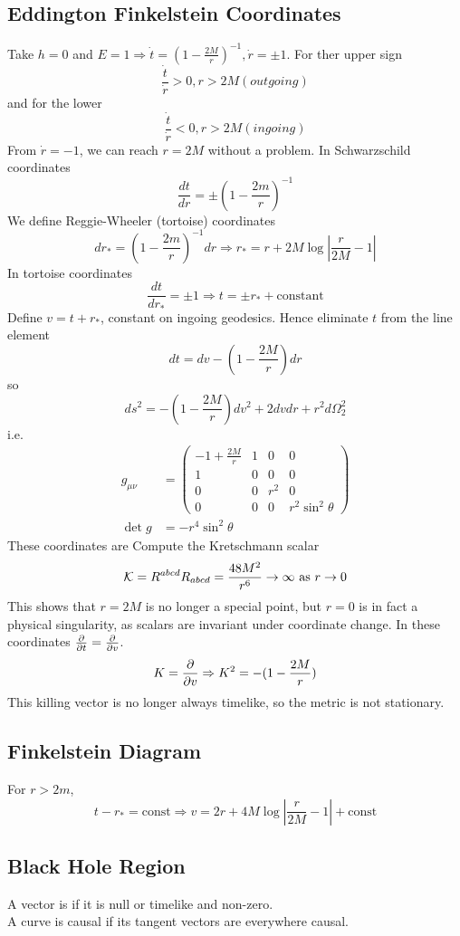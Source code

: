 \documentclass{article}
\begin{document}
\subsection{Eddington Finkelstein Coordinates}
Take $h=0$ and $E=1 \Rightarrow \dot{t} = (1-\frac{2M}{r})^{-1}, \dot{r} = \pm1$. For ther upper sign 
\[
\frac{\dot{t}}{\dot{r}} > 0, r>2M (outgoing)
\]
and for the lower 
\[
\frac{\dot{t}}{\dot{r}} < 0, r>2M (ingoing)
\]
From $\dot{r}=-1$, we can reach $r=2M$ without a problem. In Schwarzschild coordinates 
\[
\frac{dt}{dr} = \pm (1-\frac{2m}{r} )^{-1}
\]
We define Reggie-Wheeler (tortoise) coordinates
\[
dr_\ast = (1-\frac{2m}{r} )^{-1} dr \Rightarrow r_\ast = r+2M\log \left\lvert \frac{r}{2M} -1 \right\rvert
\]
In tortoise coordinates 
\[
\frac{dt}{dr_\ast} = \pm 1 \Rightarrow t = \pm r_\ast + \text{constant}
\]
Define $v=t+r_\ast$, constant on ingoing geodesics. Hence eliminate $t$ from the line element 
\[
dt = dv - (1-\frac{2M}{r}) dr 
\]
so
\[
ds^2 = -(1-\frac{2M}{r}) dv^2 + 2dvdr + r^2 d\Omega_2^2
\]
i.e. 
\begin{align*}
g_{\mu\nu} &= \begin{pmatrix} -1+\frac{2M}{r} & 1 &0 &0 \\ 1 & 0 & 0 & 0 \\ 0 & 0 & r^2 & 0\\ 0 & 0 & 0 & r^2 \sin^2 \theta \end{pmatrix} \\
\det g &= -r^4 \sin^2 \theta 
\end{align*}
These coordinates are 
Compute the Kretschmann scalar 
\[
\mathcal{K} = R^{abcd}R_{abcd} = \frac{48M^2}{r^6} \to \infty \text{ as } r\to 0
\]
This shows that $r=2M$ is no longer a special point, but $r=0$ is in fact a physical singularity, as scalars are invariant under coordinate change. 
In these coordinates $\frac{\partial}{\partial t} = \frac{\partial}{\partial v}$. 
\[
K=\frac{\partial}{\partial v} \Rightarrow K^2 = -(1-\frac{2M}{r})
\]
This killing vector is no longer always timelike, so the metric is not stationary. 

\subsection{Finkelstein Diagram}
For $r>2m$, 
\[
t-r_\ast = \text{const} \Rightarrow v = 2r + 4M\log | \frac{r}{2M} - 1| +\text{const}
\]

\subsection{Black Hole Region}
\begin{definition}[Causal]
A vector is  if it is null or timelike and non-zero. \\
A curve is causal if its tangent vectors are everywhere causal. 
\end{definition}
\end{document}
